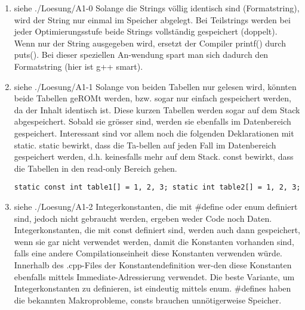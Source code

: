 \begin{enumerate}
  \item  siehe ./Loesung/A1-0
Solange die Strings völlig identisch sind (Formatstring), wird der String nur einmal im Speicher abgelegt. Bei Teilstrings werden bei jeder Optimierungsstufe beide Strings vollständig gespeichert (doppelt). Wenn nur der String ausgegeben wird, ersetzt der Compiler printf() durch puts(). Bei dieser speziellen An-wendung spart man sich dadurch den Formatstring (hier ist g++ smart).

\noindent\makebox[\linewidth]{\rule{\paperwidth}{0.4pt}}

\noindent\makebox[\linewidth]{\rule{\paperwidth}{0.4pt}}
  \item siehe ./Loesung/A1-1
Solange von beiden Tabellen nur gelesen wird, könnten beide Tabellen geROMt werden, bzw. sogar nur einfach gespeichert werden, da der Inhalt identisch ist.
Diese kurzen Tabellen werden sogar auf dem Stack abgespeichert. Sobald sie grösser sind, werden sie ebenfalls im Datenbereich gespeichert.
Interessant sind vor allem noch die folgenden Deklarationen mit static. static bewirkt, dass die Ta-bellen auf jeden Fall im Datenbereich gespeichert werden, d.h. keinesfalls mehr auf dem Stack. const bewirkt, dass die Tabellen in den read-only Bereich gehen.

\texttt{static const int table1[] = {1, 2, 3}; static int table2[] = {1, 2, 3};}



\noindent\makebox[\linewidth]{\rule{\paperwidth}{0.4pt}}

\noindent\makebox[\linewidth]{\rule{\paperwidth}{0.4pt}}

  \item siehe ./Loesung/A1-2
Integerkonstanten, die mit \#define oder enum definiert sind, jedoch nicht gebraucht werden, ergeben weder Code noch Daten. Integerkonstanten, die mit const definiert sind, werden auch dann gespeichert, wenn sie gar nicht verwendet werden, damit die Konstanten vorhanden sind, falls eine andere Compilationseinheit diese Konstanten verwenden würde. Innerhalb des .cpp-Files der Konstantendefinition wer-den diese Konstanten ebenfalls mittels Immediate-Adressierung verwendet.
Die beste Variante, um Integerkonstanten zu definieren, ist eindeutig mittels enum. \#defines haben die bekannten Makroprobleme, consts brauchen unnötigerweise Speicher.


\end{enumerate}
